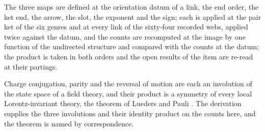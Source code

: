 The three maps are defined at the orientation datum of a link, the end order, the ket end, the arrow, the slot, the exponent and the sign; each is applied at the pair ket of the six genres and at every link of the sixty-four recorded webs, applied twice against the datum, and the counts are recomputed at the image by one function of the undirected structure and compared with the counts at the datum; the product is taken in both orders and the open results of the item are re-read at their partings.

\begin{chbridge}
Charge conjugation, parity and the reversal of motion are each an involution of the state space of a field theory, and their product is a symmetry of every local Lorentz-invariant theory, the theorem of Lueders and Pauli \cite{Luders1954,Pauli1955}. The derivation supplies the three involutions and their identity product on the counts here, and the theorem is named by correspondence.
\end{chbridge}
